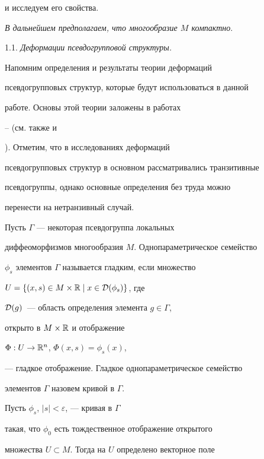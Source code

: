 и исследуем его свойства.





{\em В дальнейшем предполагаем, что многообразие $M$ компактно}.


\medskip





1.1. {\it Деформации псевдогрупповой структуры.} \label{ss1}


Напомним определения и результаты теории деформаций


псевдогрупповых структур, которые будут использоваться в данной


работе. Основы этой теории заложены в работах


\cite{Spen1}--\cite{Spen3} (см. также \cite{GuiSten} и


\cite{Kodaira}). Отметим, что в исследованиях деформаций


псевдогрупповых структур в основном рассматривались транзитивные


псевдогруппы, однако основные определения без труда можно


перенести на нетранзивный случай.





Пусть $\Gamma$ --- некоторая псевдогруппа локальных


диффеоморфизмов многообразия $M$. Однопараметрическое семейство


$\phi_s$ элементов $\Gamma$ называется гладким, если множество


$U = \{(x,s) \in M \times {\Bbb R} \mid x \in {\cal D}(\phi_s)\}$, где


${\cal D}(g)$~--- область определения элемента $g \in \Gamma$,


открыто в $M \times {\Bbb R}$ и отображение


$\Phi : U \to {\Bbb R}^n$, $\Phi(x,s) = \phi_s(x)$,


--- гладкое отображение. Гладкое однопараметрическое семейство


элементов $\Gamma$ назовем кривой в $\Gamma$.





Пусть $\phi_s$, $|s| < \varepsilon$, --- кривая в $\Gamma$


такая, что $\phi_0$ есть тождественное отображение открытого


множества $U \subset M$. Тогда на $U$ определено векторное поле


